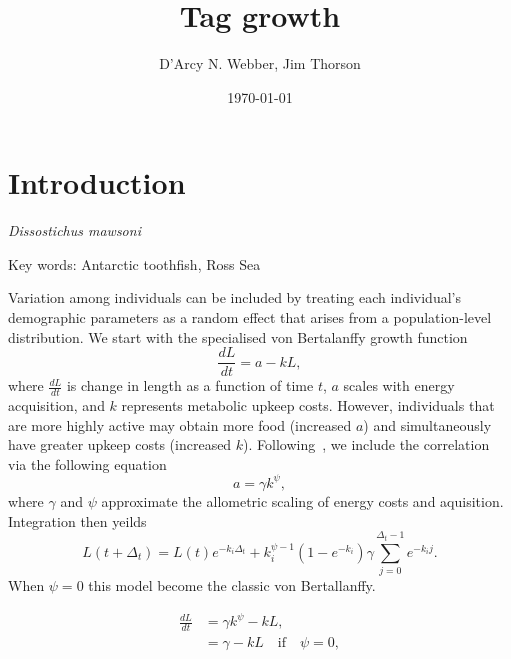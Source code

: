 \documentclass[11pt, a4paper]{article}
\title{Tag growth}
\author{D'Arcy N. Webber, Jim Thorson}
\date{\today}
\begin{document}
\maketitle

\section{Introduction}
\textit{Dissostichus mawsoni}

Key words: Antarctic toothfish, Ross Sea


Variation among individuals can be included by treating each individual's
demographic parameters as a random effect that arises from a population-level
distribution. We start with the specialised von Bertalanffy growth function
\begin{equation}
  \frac{dL}{dt} = a - k L,
\end{equation}
where $\frac{dL}{dt}$ is change in length as a function of time $t$, $a$ scales
with energy acquisition, and $k$ represents metabolic upkeep costs. However,
individuals that are more highly active may obtain more food (increased $a$)
and simultaneously have greater upkeep costs (increased
$k$). Following~\citealp{Shelton2013}, we include the correlation via the
following equation
\begin{equation}
  a = \gamma k^\psi,
\end{equation}
where $\gamma$ and $\psi$ approximate the allometric scaling of energy costs
and aquisition. Integration then yeilds
\begin{equation}
  L(t + \Delta_t) = L(t) e^{-k_i \Delta_t} + k_i^{\psi - 1} \left( 1 - e^{-k_i}
  \right) \gamma \sum_{j=0}^{\Delta_t - 1} e^{-k_i j}.
\end{equation}
When $\psi = 0$ this model become the classic von Bertallanffy.

\begin{align}
  \frac{dL}{dt} &= \gamma k^\psi - k L,\\
  &= \gamma - k L \quad \text{if} \quad \psi = 0,
\end{align}
\end{document}
